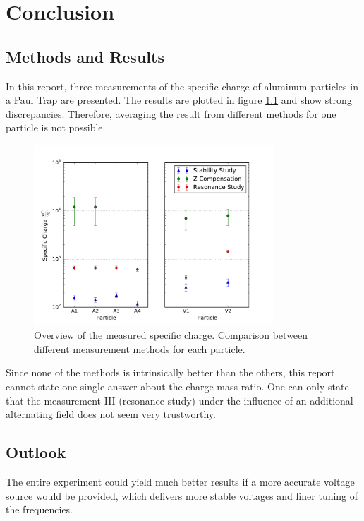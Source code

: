 \documentclass[
	paper=A4,
	parskip=full,
	chapterprefix=true,
	11pt,
	headings=normal,
	bibliography=totoc,
	listof=totoc,
	titlepage=on,
]{scrreprt}
\begin{document}
\chapter{Conclusion}

\section{Methods and Results}
In this report, three measurements of the specific charge of aluminum particles in a Paul Trap are presented. The results are plotted in figure \ref{fig:comp_results} and show strong discrepancies. Therefore, averaging the result from different methods for one particle is not possible. 

\begin{figure}
	\centering
	\includegraphics[width=0.8\textwidth]{paul_compareresults}
	\caption{Overview of the measured specific charge. Comparison between different measurement methods for each particle.}
	\label{fig:comp_results}
\end{figure}

Since none of the methods is intrinsically better than the others, this report cannot state one single answer about the charge-mass ratio.
One can only state that the measurement III (resonance study) under the influence of an additional alternating field does not seem very trustworthy. 

\section{Outlook}
The entire experiment could yield much better results if a more accurate voltage source would be provided, which delivers more stable voltages and finer tuning of the frequencies.
\end{document}
